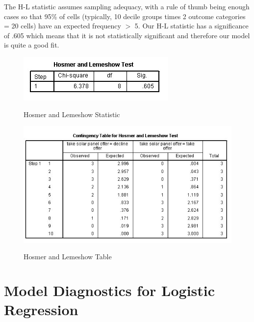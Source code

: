 \documentclass[a4paper,12pt]{article}
\begin{document}
The H-L statistic assumes sampling adequacy, with a rule of thumb being enough cases so that 95\% of cells (typically, 10 decile groups times 2 outcome categories = 20 cells) have an expected frequency $>$ 5. Our H-L statistic has a significance of .605 which means that it is not statistically significant and therefore our model is quite a
good fit.
\begin{figure}[h!]
	\begin{center}
		\includegraphics[scale=0.6]{images/Logistic7A}\\
		\caption{Hosmer and Lemeshow Statistic}
	\end{center}
\end{figure}

\begin{figure}[h!]
	\begin{center}
		\includegraphics[scale=0.6]{images/Logistic6}\\
		\caption{Hosmer and Lemeshow Table}
	\end{center}
\end{figure}


\section{Model Diagnostics for Logistic Regression}

\end{document}
